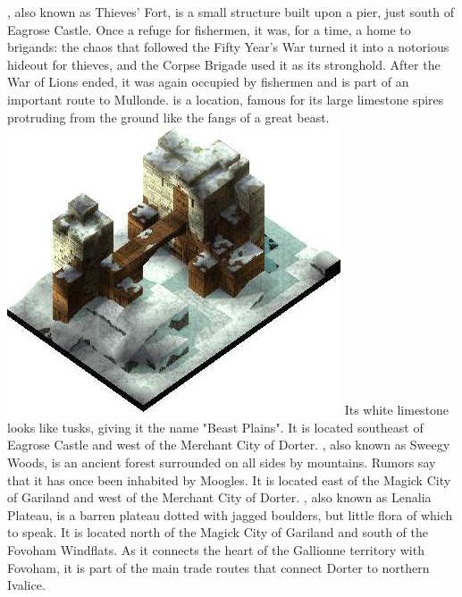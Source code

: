 , also known as Thieves' Fort, is a small structure built upon a pier, just south of Eagrose Castle. 
Once a refuge for fishermen, it was, for a time, a home to brigands: the chaos that followed the Fifty Year's War turned it into a notorious hideout for thieves, and the Corpse Brigade used it as its stronghold. 
After the War of Lions ended, it was again occupied by fishermen and is part of an important route to Mullonde.
 is a location, famous for its large limestone spires protruding from the ground like the fangs of a great beast.
%
\vfill
\includegraphics[width=\columnwidth]{./art/worldbook/zeakden.jpg}
\newpage
%
Its white limestone looks like tusks, giving it the name "Beast Plains". 
It is located southeast of Eagrose Castle and west of the Merchant City of Dorter.
, also known as Sweegy Woods, is an ancient forest surrounded on all sides by mountains. 
Rumors say that it has once been inhabited by Moogles. 
It is located east of the Magick City of Gariland and west of the Merchant City of Dorter.
, also known as Lenalia Plateau, is a barren plateau dotted with jagged boulders, but little flora of which to speak.
It is located north of the Magick City of Gariland and south of the Fovoham Windflats.
As it connects the heart of the Gallionne territory with Fovoham, it is part of the main trade routes that connect Dorter to northern Ivalice.
%
\ofpar
